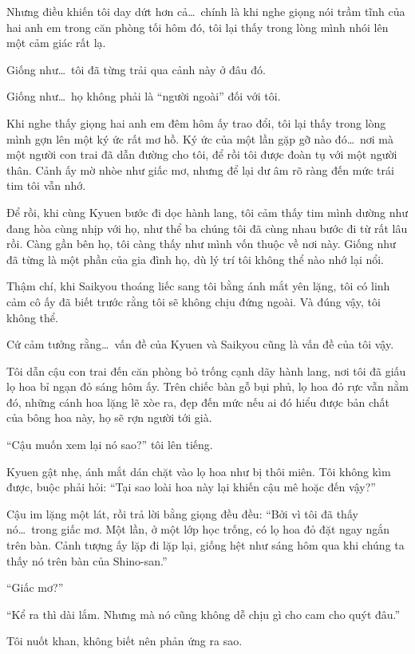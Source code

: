 \documentclass[../main.tex]{subfiles}
\begin{document}
Nhưng điều khiến tôi day dứt hơn cả\dots\ chính là khi nghe giọng nói trầm tĩnh của hai anh em trong căn phòng tối hôm đó, tôi lại thấy trong lòng mình nhói lên một cảm giác rất lạ.

Giống như\dots\ tôi đã từng trải qua cảnh này ở đâu đó.

Giống như\dots\ họ không phải là ``người ngoài'' đối với tôi.

Khi nghe thấy giọng hai anh em đêm hôm ấy trao đổi, tôi lại thấy trong lòng mình gợn lên một ký ức rất mơ hồ. Ký ức của một lần gặp gỡ nào đó\dots\ nơi mà một người con trai đã dẫn đường cho tôi, để rồi tôi được đoàn tụ với một người thân. Cảnh ấy mờ nhòe như giấc mơ, nhưng để lại dư âm rõ ràng đến mức trái tim tôi vẫn nhớ.

Để rồi, khi cùng Kyuen bước đi dọc hành lang, tôi cảm thấy tim mình dường như đang hòa cùng nhịp với họ, như thể ba chúng tôi đã cùng nhau bước đi từ rất lâu rồi. Càng gần bên họ, tôi càng thấy như mình vốn thuộc về nơi này. Giống như đã từng là một phần của gia đình họ, dù lý trí tôi không thể nào nhớ lại nổi.

Thậm chí, khi Saikyou thoáng liếc sang tôi bằng ánh mắt yên lặng, tôi có linh cảm cô ấy đã biết trước rằng tôi sẽ không chịu đứng ngoài. Và đúng vậy, tôi không thể.

Cứ cảm tưởng rằng\dots\ vấn đề của Kyuen và Saikyou cũng là vấn đề của tôi vậy.

\ct

Tôi dẫn cậu con trai đến căn phòng bỏ trống cạnh dãy hành lang, nơi tôi đã giấu lọ hoa bỉ ngạn đỏ sáng hôm ấy. Trên chiếc bàn gỗ bụi phủ, lọ hoa đỏ rực vẫn nằm đó, những cánh hoa lặng lẽ xòe ra, đẹp đến mức nếu ai đó hiểu được bản chất của bông hoa này, họ sẽ rợn người tới già.

``Cậu muốn xem lại nó sao?'' tôi lên tiếng.

Kyuen gật nhẹ, ánh mắt dán chặt vào lọ hoa như bị thôi miên. Tôi không kìm được, buộc phải hỏi: ``Tại sao loài hoa này lại khiến cậu mê hoặc đến vậy?''

Cậu im lặng một lát, rồi trả lời bằng giọng đều đều: ``Bởi vì tôi đã thấy nó\dots\ trong giấc mơ. Một lần, ở một lớp học trống, có lọ hoa đỏ đặt ngay ngắn trên bàn. Cảnh tượng ấy lặp đi lặp lại, giống hệt như sáng hôm qua khi chúng ta thấy nó trên bàn của Shino-san.''

``Giấc mơ?''

``Kể ra thì dài lắm. Nhưng mà nó cũng không dễ chịu gì cho cam cho quýt đâu.''

Tôi nuốt khan, không biết nên phản ứng ra sao.
\end{document}
